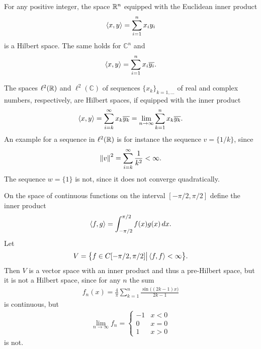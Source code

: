 \begin{example}
  For any positive integer, the space $\mathbb R^n$ equipped with the
  Euclidean inner product
  \begin{gather*}
    \scal(x,y) = \sum_{i=1}^n x_i y_i
  \end{gather*}
  is a Hilbert space. The same holds for $\mathbb C^n$ and
  \begin{gather*}
    \scal(x,y) = \sum_{i=1}^n x_i \overline{y_i}.
  \end{gather*}
\end{example}

\begin{example}
  The spaces $\ell^2(\mathbb R)$ and $\ell^2(\mathbb C)$ of sequences
  $\{x_k\}_{k=1,\dots}$ of real and complex numbers, respectively, are
  Hilbert spaces, if equipped with the inner product
  \begin{gather*}
    \scal(x,y) = \sum_{i=k}^\infty x_k \overline{y_k}
    = \lim_{n\to\infty}\sum_{k=1}^n x_k \overline{y_k}.
  \end{gather*}
  An example for a sequence in $\ell^2(\mathbb R)$ is for instance the
  sequence $v = \{1/k\}$, since
  \begin{gather*}
    \left\|v\right\|^2 = \sum_{i=k}^\infty \frac1{k^2} < \infty.
  \end{gather*}
  The sequence $w = \{1\}$ is not, since it does not converge
  quadratically.
\end{example}

\begin{example}
  On the space of continuous functions on the interval
  $[-\pi/2,\pi/2]$ define the inner product
  \begin{gather*}
    \scal(f,g) = \int_{-\pi/2}^{\pi/2} f(x)g(x)\,dx.
  \end{gather*}
  Let
  \begin{gather*}
    V = \bigl\{f\in C[-\pi/2,\pi/2] \big| \scal(f,f) < \infty \bigr\}.
  \end{gather*}
  Then $V$ is a vector space with an inner product and thus a
  pre-Hilbert space, but it is not a Hilbert space, since for any $n$
  the sum
  \begin{gather*}
    f_n(x) = \frac4\pi \sum_{k=1}^n \frac{\sin\bigl((2k-1) x\bigr)}{2k-1}
  \end{gather*}
  is continuous, but
  \begin{gather*}
    \lim_{n\to\infty} f_n =
    \begin{cases}
      -1 & x<0 \\
      0 & x=0 \\
      1 & x>0
    \end{cases}
  \end{gather*}
  is not.
\end{example}



